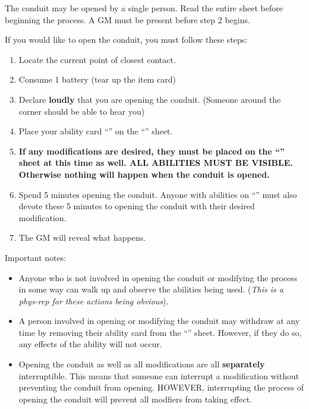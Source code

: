 \documentclass[green]{elementals}
\begin{document}
\name{\gConduit{}}

The conduit may be opened by a single person. Read the entire sheet before beginning the process. A GM must be present before step 2 begins.


If you would like to open the conduit, you must follow these steps:
\begin{enumerate}
  \item Locate the current point of closest contact.
  \item Consume 1 battery (tear up the item card)
  \item Declare {\bf loudly} that you are opening the conduit. (Someone around the corner should be able to hear you)
  \item Place your ability card ``\aWorkConduit{}'' on the ``\gConduitModifier{}'' sheet.
  \item {\bf If any modifications are desired, they must be placed on the ``\gConduitModifier{}'' sheet at this time as well. ALL ABILITIES MUST BE VISIBLE. Otherwise nothing will happen when the conduit is opened.}
  \item Spend 5 minutes opening the conduit. Anyone with abilities on ``\gConduitModifier{}'' must also devote these 5 minutes to opening the conduit with their desired modification.
  \item The GM will reveal what happens.
\end{enumerate}

Important notes:
\begin{itemize}
  \item Anyone who is not involved in opening the conduit or modifying the process in some way can walk up and observe the abilities being used. (\emph{This is a phys-rep for these actions being obvious}).
  \item A person involved in opening or modifying the conduit may withdraw at any time by removing their ability card from the ``\gConduitModifier{}'' sheet. However, if they do so, any effects of the ability will not occur.
  \item Opening the conduit as well as all modifications are all {\bf separately} interruptible. This means that someone can interrupt a modification without preventing the conduit from opening. HOWEVER, interrupting the process of opening the conduit will prevent all modfiers from taking effect.
\end{itemize}
\end{document}
